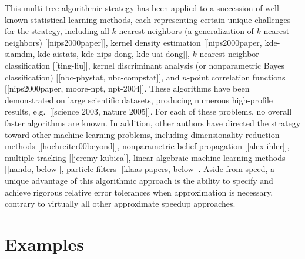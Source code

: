 \documentclass{article}
\begin{document}
This multi-tree algorithmic strategy has been applied to a succession
of well-known statistical learning methods, each representing certain
unique challenges for the strategy, including
all-$k$-nearest-neighbors (a generalization of $k$-nearest-neighbors)
[[nips2000paper]], kernel density estimation [[nips2000paper,
kde-siamdm, kde-aistats, kde-nips-dong, kde-uai-dong]],
$k$-nearest-neighbor classification [[ting-liu]], kernel discriminant
analysis (or nonparametric Bayes classification) [[nbc-phystat,
nbc-compstat]], and $n$-point correlation functions [[nips2000paper,
moore-npt, npt-2004]].  These algorithms have been demonstrated on
large scientific datasets, producing numerous high-profile results,
e.g.~[[science 2003, nature 2005]].  For each of these problems, no
overall faster algorithms are known.  In addition, other authors have
directed the strategy toward other machine learning problems,
including dimensionality reduction methods [[hochreiter00beyond]],
nonparametric belief propagation [[alex ihler]], multiple tracking
[[jeremy kubica]], linear algebraic machine learning methods [[nando,
below]], particle filters [[klaas papers, below]].  Aside from speed,
a unique advantage of this algorithmic approach is the ability to
specify and achieve rigorous relative error tolerances when
approximation is necessary, contrary to virtually all other
approximate speedup approaches.
%
%
%
%
%

\section{Examples}

\end{document}
